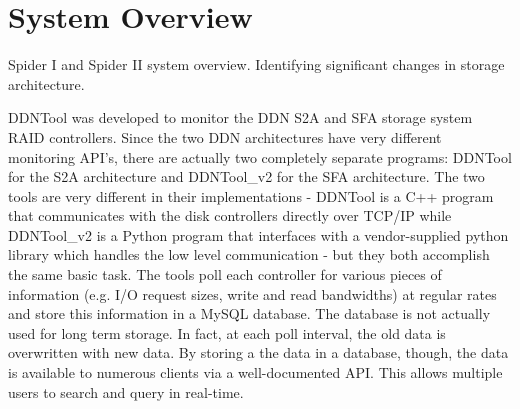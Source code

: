 \section{System Overview}
\label{sec:overview}

Spider I and Spider II system overview. Identifying significant changes in storage architecture.


DDNTool \cite{ddntool10:ross} was developed to monitor the DDN S2A and SFA storage system RAID controllers. Since the two DDN architectures have very different monitoring API's, there are actually two completely separate programs:  DDNTool for the S2A architecture and DDNTool\_v2 for the SFA architecture.  The two tools are very different in their implementations - DDNTool is a C++ program that communicates with the disk controllers directly over TCP/IP while DDNTool\_v2 is a Python program that interfaces with a vendor-supplied python library which handles the low level communication - but they both accomplish the same basic task.  The tools poll each controller for various pieces of information (e.g. I/O request sizes, write and read bandwidths) at regular rates and store this information in a MySQL database.  The database is not actually used for long term storage.  In fact, at each poll interval, the old data is overwritten with new data.  By storing a the data in a database, though, the data is available to numerous clients via a well-documented API.  This allows multiple users to search and query in real-time.

